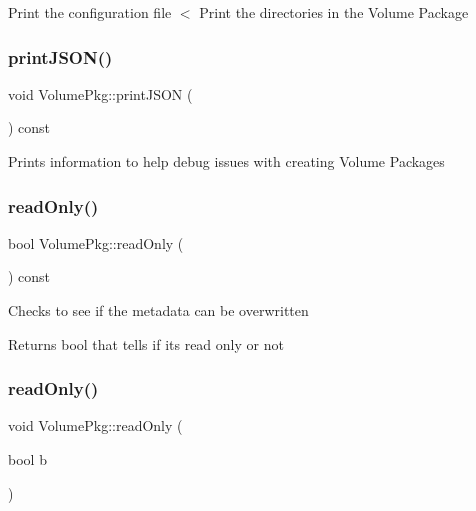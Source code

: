 Print the configuration file $<$ Print the directories in the Volume Package \hypertarget{classVolumePkg_ab4c4d6cb9715dbdde2e76f96115d94f9}{}\label{classVolumePkg_ab4c4d6cb9715dbdde2e76f96115d94f9} 
\subsubsection{\texorpdfstring{print\+J\+S\+O\+N()}{printJSON()}}
{\footnotesize\ttfamily void Volume\+Pkg\+::print\+J\+S\+ON (\begin{DoxyParamCaption}{ }\end{DoxyParamCaption}) const\hspace{0.3cm}{\ttfamily [inline]}}

Prints information to help debug issues with creating Volume Packages \hypertarget{classVolumePkg_a1cf5ee88ba2392ab825619ef7890d7ae}{}\label{classVolumePkg_a1cf5ee88ba2392ab825619ef7890d7ae} 
\subsubsection{\texorpdfstring{read\+Only()}{readOnly()}\hspace{0.1cm}{\footnotesize\ttfamily [1/2]}}
{\footnotesize\ttfamily bool Volume\+Pkg\+::read\+Only (\begin{DoxyParamCaption}{ }\end{DoxyParamCaption}) const\hspace{0.3cm}{\ttfamily [inline]}}

Checks to see if the metadata can be overwritten \begin{DoxyReturn}{Returns}
bool that tells if it\textquotesingle{}s read only or not 
\end{DoxyReturn}
\hypertarget{classVolumePkg_a4dba1fc88e4390da1ad9fadf4c73b41b}{}\label{classVolumePkg_a4dba1fc88e4390da1ad9fadf4c73b41b} 
\subsubsection{\texorpdfstring{read\+Only()}{readOnly()}\hspace{0.1cm}{\footnotesize\ttfamily [2/2]}}
{\footnotesize\ttfamily void Volume\+Pkg\+::read\+Only (\begin{DoxyParamCaption}\item[{bool}]{b }\end{DoxyParamCaption})\hspace{0.3cm}{\ttfamily [inline]}}

